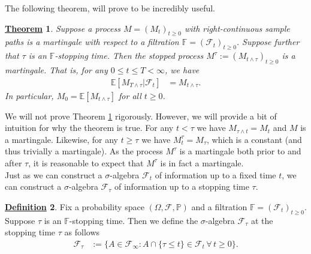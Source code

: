 \documentclass[12pt]{book}
\numberwithin{equation}{chapter}
\theoremstyle{plain}
\newtheorem{theorem}{\underline{Theorem}}
\numberwithin{theorem}{section}
\theoremstyle{definition}
\newtheorem{definition}[theorem]{\underline{Definition}}
\numberwithin{exercise}{chapter}
\newcommand{\<}{\langle}
\renewcommand{\>}{\rangle}
\renewcommand{\(}{\left(}
\renewcommand{\)}{\right)}
\renewcommand{\[}{\left[}
\renewcommand{\]}{\right]}
\newcommand\Eb{\mathds{E}}
\newcommand\Fb{\mathds{F}}
\newcommand\Pb{\mathds{P}}
\newcommand\Fc{\mathscr{F}}
\newcommand\Om{\Omega}
\newcommand\sig{\sigma}
\begin{document}
\noindent
The following theorem, will prove to be incredibly useful.

\begin{theorem}
\label{thm:stopped.martingale}
Suppose a process $M = (M_t)_{t \geq 0}$ with right-continuous sample paths is a martingale with respect to a filtration $\Fb = (\Fc_t)_{t \geq 0}$.
Suppose further that $\tau$ is an $\Fb$-stopping time.  Then the \emph{stopped process} $M^\tau := (M_{t \wedge \tau})_{t \geq 0}$ is a martingale.  That is, for any $0 \leq t \leq T < \infty$, we have
\begin{align}
\Eb[ M_{T \wedge \tau} | \Fc_t ]
	&=	M_{t \wedge \tau} .
\end{align}
In particular, $M_0 = \Eb[ M_{t \wedge \tau} ]$ for all $t \geq 0$.
\end{theorem}

\noindent
We will not prove Theorem \ref{thm:stopped.martingale} rigorously.  However, we will provide a bit of intuition for why the theorem is true.  For any $t < \tau$ we have $M_{\tau \wedge t} = M_t$ and $M$ is a martingale.  Likewise, for any $t \geq \tau$ we have $M_t^\tau = M_\tau$, which is a constant (and thus trivially a martingale).
As the process $M^\tau$ is a martingale both prior to and after $\tau$, it is reasonable to expect that $M^\tau$ is in fact a martingale.
\\[0.5em]
Just as we can construct a $\sig$-algebra $\Fc_t$ of information up to a fixed time $t$, we can construct a $\sig$-algebra $\Fc_\tau$ of information up to a stopping time $\tau$.  

\begin{definition}
\label{def:Fc.tau}
Fix a probability space $(\Om,\Fc,\Pb)$ and a filtration $\Fb = (\Fc_t)_{t \geq 0}$.  Suppose $\tau$ is an $\Fb$-stopping time.  Then we define the $\sig$-algebra $\Fc_\tau$ at the stopping time $\tau$ as follows
\begin{align}
\Fc_\tau
	&:=	\{ A \in \Fc_\infty : A \cap \{ \tau \leq t \} \in \Fc_t \, \forall \, t \geq 0 \} . \label{eq:Fc.tau}
\end{align}
\end{definition}
\end{document}
